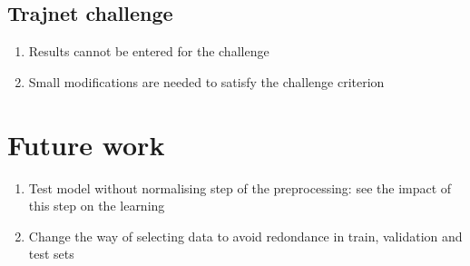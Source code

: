 \documentclass[a0,portrait]{a0poster}
\begin{document}
\begin{multicols}{2}
\subsection*{Trajnet challenge}
\begin{enumerate}
\justifying
\item Results cannot be entered for the challenge
\item Small modifications are needed to satisfy the challenge criterion
\end{enumerate}

\section*{Future work}
\begin{enumerate}
\item Test model without normalising step of the preprocessing: see the impact of this step on the learning
\item Change the way of selecting data to avoid redondance in train, validation and test sets
\end{enumerate}



\nocite{*} %


\end{multicols}
\end{document}
